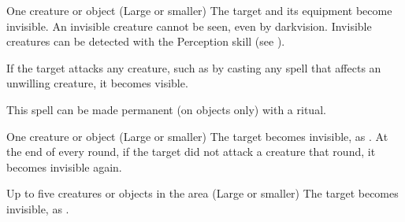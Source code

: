 \begin{spellheader}
    \spellrng{\rngclose}
    \spelldur{\durshort \dismissable}
\end{spellheader}
\begin{spelleffects}
    \begin{spelltarget}{One creature or object (Large or smaller)}
        \spelleffect The target and its equipment become invisible. An invisible creature cannot be seen, even by darkvision. Invisible creatures can be detected with the Perception skill (see ).

        If the target attacks any creature, such as by casting any spell that affects an unwilling creature, it becomes visible.
    \end{spelltarget}
\end{spelleffects}
\begin{spellfooter}
    \spellnotes This spell can be made permanent (on objects only) with a  ritual.
\end{spellfooter}

\begin{spellheader}
    \spellrng{\rngclose}
    \spelldur{\durshort \dismissable}
\end{spellheader}
\begin{spelleffects}
    \begin{spelltarget}{One creature or object (Large or smaller)}
        \spelleffect The target becomes invisible, as . At the end of every round, if the target did not attack a creature that round, it becomes invisible again.
    \end{spelltarget}
\end{spelleffects}

\begin{spellheader}
    \spelldur{\durshort \dismissable}
\end{spellheader}
\begin{spelleffects}
    \begin{spelltargets}{Up to five creatures or objects in the area (Large or smaller)}
        \spelleffect The target becomes invisible, as .
    \end{spelltargets}
\end{spelleffects}


